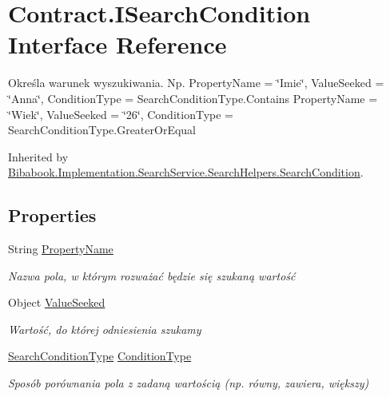 \hypertarget{interface_contract_1_1_i_search_condition}{}\section{Contract.\+I\+Search\+Condition Interface Reference}
\label{interface_contract_1_1_i_search_condition}


Określa warunek wyszukiwania. Np. Property\+Name = \char`\"{}\+Imie\char`\"{}, Value\+Seeked = \char`\"{}\+Anna\char`\"{}, Condition\+Type = Search\+Condition\+Type.\+Contains Property\+Name = \char`\"{}\+Wiek\char`\"{}, Value\+Seeked = \char`\"{}26\char`\"{}, Condition\+Type = Search\+Condition\+Type.\+Greater\+Or\+Equal  




Inherited by \hyperlink{class_bibabook_1_1_implementation_1_1_search_service_1_1_search_helpers_1_1_search_condition}{Bibabook.\+Implementation.\+Search\+Service.\+Search\+Helpers.\+Search\+Condition}.

\subsection*{Properties}
\begin{DoxyCompactItemize}
\item 
String \hyperlink{interface_contract_1_1_i_search_condition_a8f7b70f08060863e7c9e7b1055d8561c}{Property\+Name}
\begin{DoxyCompactList}\small\item\em Nazwa pola, w którym rozważać będzie się szukaną wartość \end{DoxyCompactList}\item 
Object \hyperlink{interface_contract_1_1_i_search_condition_a24149b101ea72f8b02bf839a50ead65e}{Value\+Seeked}
\begin{DoxyCompactList}\small\item\em Wartość, do której odniesienia szukamy \end{DoxyCompactList}\item 
\hyperlink{namespace_contract_1_1_enums_aaec9cf8d7ed5b1eb4f9b9252c3ac10aa}{Search\+Condition\+Type} \hyperlink{interface_contract_1_1_i_search_condition_a48da2c8880a2efa80cb2f74d3511da56}{Condition\+Type}
\begin{DoxyCompactList}\small\item\em Sposób porównania pola z zadaną wartością (np. równy, zawiera, większy) \end{DoxyCompactList}\end{DoxyCompactItemize}


